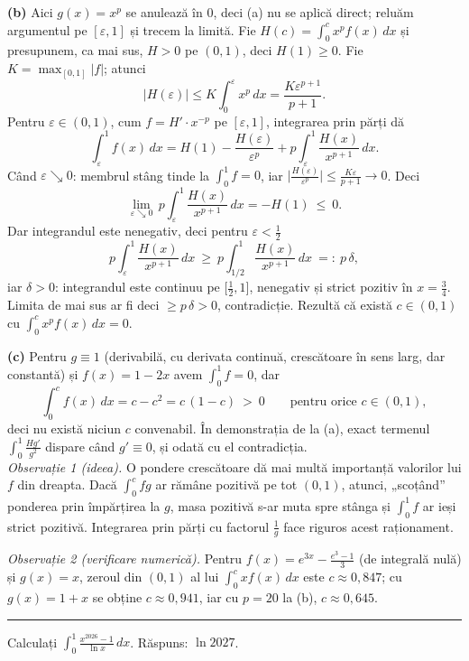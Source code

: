 \textbf{(b)} Aici $g(x)=x^{p}$ se anulează în $0$, deci (a) nu se aplică direct; reluăm argumentul pe $[\varepsilon,1]$ și trecem la limită. Fie $H(c)=\displaystyle\int_0^c x^{p}f(x)\,dx$ și presupunem, ca mai sus, $H>0$ pe $(0,1)$, deci $H(1)\ge0$. Fie $K=\max_{[0,1]}|f|$; atunci
\[ |H(\varepsilon)|\le K\int_0^\varepsilon x^{p}\,dx=\frac{K\varepsilon^{p+1}}{p+1} . \]
Pentru $\varepsilon\in(0,1)$, cum $f=H'\cdot x^{-p}$ pe $[\varepsilon,1]$, integrarea prin părți dă
\[ \int_\varepsilon^1 f(x)\,dx=H(1)-\frac{H(\varepsilon)}{\varepsilon^{p}}+p\int_\varepsilon^1\frac{H(x)}{x^{p+1}}\,dx . \]
Când $\varepsilon\searrow0$: membrul stâng tinde la $\int_0^1 f=0$, iar $\bigl|\frac{H(\varepsilon)}{\varepsilon^{p}}\bigr|\le\frac{K\varepsilon}{p+1}\to0$. Deci
\[ \lim_{\varepsilon\searrow0}\,p\int_\varepsilon^1\frac{H(x)}{x^{p+1}}\,dx=-H(1)\ \le\ 0 . \]
Dar integrandul este nenegativ, deci pentru $\varepsilon<\frac12$
\[ p\int_\varepsilon^1\frac{H(x)}{x^{p+1}}\,dx\ \ge\ p\int_{1/2}^1\frac{H(x)}{x^{p+1}}\,dx\ =:\ p\,\delta , \]
iar $\delta>0$: integrandul este continuu pe $\bigl[\frac12,1\bigr]$, nenegativ și strict pozitiv în $x=\frac34$. Limita de mai sus ar fi deci $\ge p\,\delta>0$, contradicție. Rezultă că există $c\in(0,1)$ cu $\int_0^c x^{p}f(x)\,dx=0$.

\textbf{(c)} Pentru $g\equiv1$ (derivabilă, cu derivata continuă, crescătoare în sens larg, dar constantă) și $f(x)=1-2x$ avem $\int_0^1 f=0$, dar
\[ \int_0^c f(x)\,dx=c-c^{2}=c\,(1-c)\ >\ 0\qquad\text{pentru orice }c\in(0,1) , \]
deci nu există niciun $c$ convenabil. În demonstrația de la (a), exact termenul $\int_0^1\frac{Hg'}{g^{2}}$ dispare când $g'\equiv0$, și odată cu el contradicția.\\[2pt]
\emph{Observație 1 (ideea).} O pondere crescătoare dă mai multă importanță valorilor lui $f$ din dreapta. Dacă $\int_0^c fg$ ar rămâne pozitivă pe tot $(0,1)$, atunci, „scoțând'' ponderea prin împărțirea la $g$, masa pozitivă s-ar muta spre stânga și $\int_0^1 f$ ar ieși strict pozitivă. Integrarea prin părți cu factorul $\frac1g$ face riguros acest raționament.

\emph{Observație 2 (verificare numerică).} Pentru $f(x)=e^{3x}-\frac{e^{3}-1}{3}$ (de integrală nulă) și $g(x)=x$, zeroul din $(0,1)$ al lui $\int_0^c xf(x)\,dx$ este $c\approx0{,}847$; cu $g(x)=1+x$ se obține $c\approx0{,}941$, iar cu $p=20$ la (b), $c\approx0{,}645$.
\vspace{1mm}\hrule

Calculați $\displaystyle\int_0^1\frac{x^{2026}-1}{\ln x}\,dx$.
\sol Răspuns: $\ln2027$.

